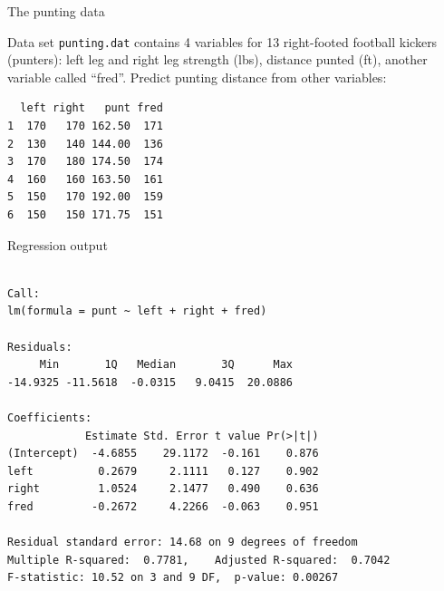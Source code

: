 \begin{frame}[fragile]{The punting data}

  Data set \verb-punting.dat- contains 4 variables for 13 right-footed
  football kickers (punters): left leg and right leg strength (lbs),
  distance punted (ft), another variable called ``fred''. Predict
  punting distance from other variables:

 
\begin{knitrout}
\color{fgcolor}\begin{kframe}
\begin{alltt}
\hlkwb{=}\hlstd{(}\hlstd{,}
\end{alltt}
\begin{verbatim}
  left right   punt fred
1  170   170 162.50  171
2  130   140 144.00  136
3  170   180 174.50  174
4  160   160 163.50  161
5  150   170 192.00  159
6  150   150 171.75  151
\end{verbatim}
\begin{alltt}
\hlkwb{=}\hlopt{~}\hlopt{+}\hlopt{+}
\end{alltt}
\end{kframe}
\end{knitrout}
  
  
\end{frame}

\begin{frame}[fragile]{Regression output}

{\small
 
\begin{knitrout}
\color{fgcolor}\begin{kframe}
\begin{alltt}
\end{alltt}
\begin{verbatim}

Call:
lm(formula = punt ~ left + right + fred)

Residuals:
     Min       1Q   Median       3Q      Max 
-14.9325 -11.5618  -0.0315   9.0415  20.0886 

Coefficients:
            Estimate Std. Error t value Pr(>|t|)
(Intercept)  -4.6855    29.1172  -0.161    0.876
left          0.2679     2.1111   0.127    0.902
right         1.0524     2.1477   0.490    0.636
fred         -0.2672     4.2266  -0.063    0.951

Residual standard error: 14.68 on 9 degrees of freedom
Multiple R-squared:  0.7781,	Adjusted R-squared:  0.7042 
F-statistic: 10.52 on 3 and 9 DF,  p-value: 0.00267
\end{verbatim}
\end{kframe}
\end{knitrout}
}


\end{frame}


